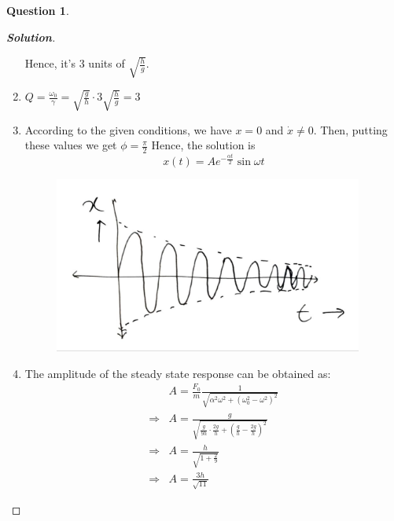 \documentclass[10pt]{scrartcl}
\theoremstyle{definition}
\newtheorem{exercise}{Question}
\newenvironment{solution} {\begin{proof}[\normalfont \textbf{Solution}]} {\end{proof}}
\begin{document}
\begin{exercise}
\begin{solution}
\begin{enumerate}[label={(\alph*)}]
                Hence, it's $3$ units of $\sqrt{\frac{h}{g}}$.
            \item $Q = \frac{\omega_0}{\gamma} = \sqrt{\frac{g}{h}} \cdot 3\sqrt{\frac{h}{g}} = 3$
            \item  According to the given conditions, we have $x = 0$ and $\dot{x} \neq 0$. Then, putting these values
                we get $\boxed{\phi = \frac{\pi}{2}}$ Hence, the solution is 
                $$\boxed{x(t) = Ae^{-\frac{\alpha t}{2}}\sin\omega t}$$
                \begin{figure}[h]
                    \centering
                    \includegraphics[width = 4.0in]{damped.jpg}
                \end{figure}
            \item The amplitude of the steady state response can be obtained as:
                \begin{align*}
                    &A = \frac{F_0}{m} \frac{1}{\sqrt{\alpha^2\omega^2 + (\omega_0^2 - \omega^2)^2}} \\ 
                    \Rightarrow &A = \frac{g}{\sqrt{\frac{g}{9h}\cdot \frac{2g}{h} + (\frac{g}{h} - \frac{2g}{h})^2}} \\ 
                    \Rightarrow &A = \frac{h}{\sqrt{1 + \frac{2}{9}}} \\ 
                    \Rightarrow &\boxed{A = \frac{3h}{\sqrt{11}}}
                \end{align*}
        \end{enumerate}
    \end{solution}
\end{exercise}
\end{document}
